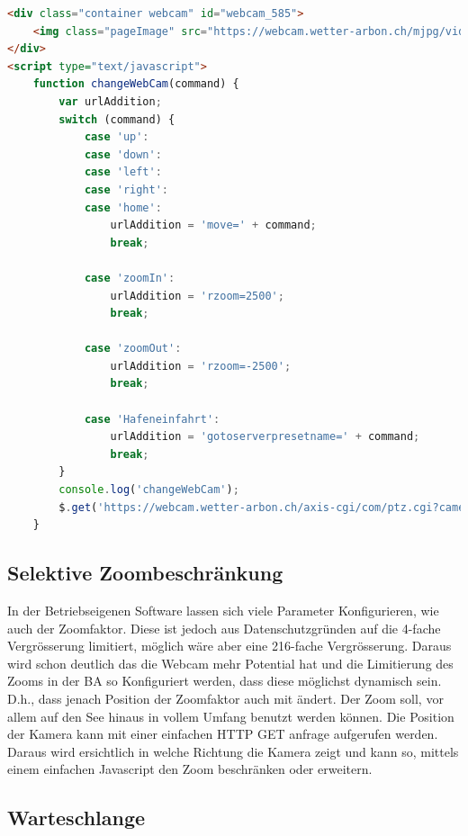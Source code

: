 \begin{lstlisting}[caption={Webcam},label={lst:cam},language=html]
 <div class="container webcam" id="webcam_585">
	<img class="pageImage" src="https://webcam.wetter-arbon.ch/mjpg/video.mjpg" alt="" />
</div>
<script type="text/javascript">
	function changeWebCam(command) {
		var urlAddition;
		switch (command) {
			case 'up':
			case 'down':
			case 'left':
			case 'right':
			case 'home':
				urlAddition = 'move=' + command;
				break;
				
			case 'zoomIn':
				urlAddition = 'rzoom=2500';
				break;
				
			case 'zoomOut':
				urlAddition = 'rzoom=-2500';
				break;
				
			case 'Hafeneinfahrt':
				urlAddition = 'gotoserverpresetname=' + command;
				break;		
		}
		console.log('changeWebCam');
		$.get('https://webcam.wetter-arbon.ch/axis-cgi/com/ptz.cgi?camera=1&' + urlAddition);
	}
\end{lstlisting}


\subsection{Selektive Zoombeschränkung}
In der Betriebseigenen Software lassen sich viele Parameter Konfigurieren, wie auch der Zoomfaktor. Diese ist jedoch aus Datenschutzgründen auf die 4-fache Vergrösserung limitiert, möglich wäre aber eine 216-fache Vergrösserung. Daraus wird schon deutlich das die Webcam mehr Potential hat und die Limitierung des Zooms in der BA so Konfiguriert werden, dass diese möglichst dynamisch sein. D.h., dass jenach Position der Zoomfaktor auch mit ändert. Der Zoom soll, vor allem auf den See hinaus in vollem Umfang benutzt werden können. Die Position der Kamera kann mit einer einfachen HTTP GET anfrage aufgerufen werden. Daraus wird ersichtlich in welche Richtung die Kamera zeigt und kann so, mittels einem einfachen Javascript den Zoom beschränken oder erweitern.

\subsection{Warteschlange}


